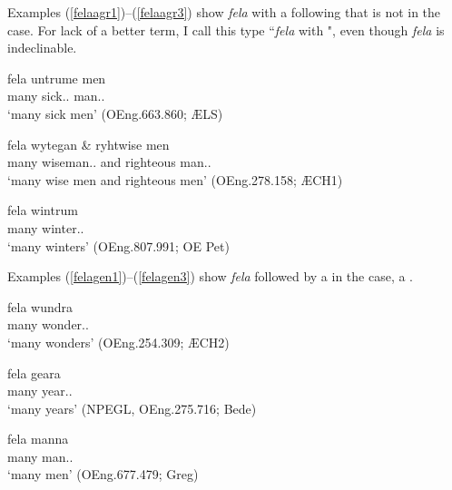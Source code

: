 \documentclass[output=paper,colorlinks,citecolor=brown]{langscibook}
\begin{document}
Examples (\ref{felaagr1})--(\ref{felaagr3}) show \textit{fela} with a following  that is not in the  case. For lack of a better term, I call this type ``\textit{fela} with ", even though \textit{fela} is indeclinable. 

\ea\label{felaagr1}
\gll fela untrume men\\
many sick.\NOM.\PL{} man.\NOM.\PL\\
\glt ‘many sick men’ (OEng.663.860; ÆLS)
\z

\ea\label{felaagr2}
\gll fela wytegan \& ryhtwise men\\
many wiseman.\NOM.\PL{} and righteous man.\NOM.\PL\\
\glt ‘many wise men and righteous men’ (OEng.278.158; ÆCH1)
\z

\ea\label{felaagr3}
\gll fela wintrum\\
many winter.\DAT.\PL\\
\glt ‘many winters’ (OEng.807.991; OE Pet)
\z

Examples (\ref{felagen1})--(\ref{felagen3}) show \textit{fela} followed by a  in the  case, a  . 

\ea\label{felagen1}
\gll fela wundra\\
	many wonder.\GEN.\PL\\
\glt ‘many wonders’	 (OEng.254.309; ÆCH2)
\z

\ea\label{felagen2}
\gll fela geara\\
	many year.\GEN.\PL\\
\glt ‘many years’ (NPEGL, OEng.275.716; Bede)
\z

\ea\label{felagen3}
\gll fela manna\\
	many man.\GEN.\PL\\
\glt ‘many men’ (OEng.677.479; Greg)
\z
\end{document}
